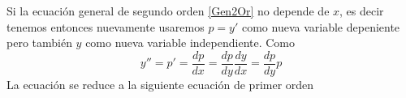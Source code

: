 Si la ecuación general de segundo orden \eqref{Gen2Or} no depende de $x$, es decir tenemos
entonces nuevamente usaremos $\boxed{p=y'}$ como nueva variable depeniente
pero también  $\boxed{y}$ como nueva variable independiente. Como
\[y''=p'=\frac{dp}{dx}=\frac{dp}{dy}\frac{dy}{dx}=\frac{dp}{dy}p\]
La ecuación se reduce a la siguiente ecuación de primer orden


% 
% 
% 
% 
% 
% 
% 
% 
% 
% 
% 
% 
% 
% 
% 
% 
% 
